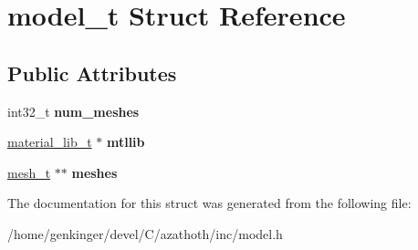 \hypertarget{structmodel__t}{}\section{model\+\_\+t Struct Reference}
\label{structmodel__t}
\subsection*{Public Attributes}
\begin{DoxyCompactItemize}
\item 
\mbox{\label{structmodel__t_a3919e88c8f93e362a0efe3f303aedc5b}} 
int32\+\_\+t {\bfseries num\+\_\+meshes}
\item 
\mbox{\label{structmodel__t_ae374abb01c41eeeb7fe6e20b1ed7bcf3}} 
\mbox{\hyperlink{structmaterial__lib__t}{material\+\_\+lib\+\_\+t}} $\ast$ {\bfseries mtllib}
\item 
\mbox{\label{structmodel__t_aac7a6a825743bceaf68cb86c227fcc6e}} 
\mbox{\hyperlink{structmesh__t}{mesh\+\_\+t}} $\ast$$\ast$ {\bfseries meshes}
\end{DoxyCompactItemize}


The documentation for this struct was generated from the following file\+:\begin{DoxyCompactItemize}
\item 
/home/genkinger/devel/\+C/azathoth/inc/model.\+h\end{DoxyCompactItemize}
